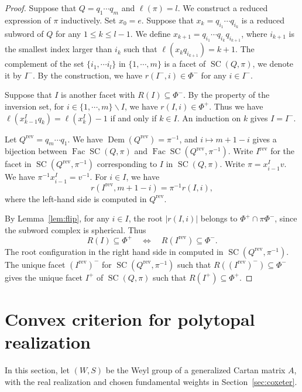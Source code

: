\documentclass[11pt,a4paper]{article}
\theoremstyle{definition}
\theoremstyle{remark}
\newcommand{\SC}{\operatorname{SC}}
\newcommand{\Dem}{\operatorname{Dem}}
\newcommand{\Fac}{\operatorname{Fac}}
\numberwithin{equation}{section}
\newcommand{\SCQ}{\operatorname{SC}(Q,\pi)}
\begin{document}
\begin{proof}
Suppose that $Q=q_1\cdots q_m$ and $\ell(\pi)=l$. We construct a reduced expression of $\pi$ inductively. Set $x_0=e$. Suppose that $x_k=q_{i_1}\cdots q_{i_k}$ is a reduced subword of $Q$ for any $1\leq k \leq l-1$. We define $x_{k+1}=q_{i_1}\cdots q_{i_k}q_{i_{k+1}}$, where $i_{k+1}$ is the smallest index larger than $i_k$ such that $\ell(x_k q_{i_{k+1}})=k+1$. The complement of the set $\{i_1,\cdots i_l\}$ in $\{1,\cdots, m\}$ is a facet of $\SCQ$, we denote it by $I^-$. By the construction, we have $r(I^-,i)\in \Phi^-$ for any $i\in I^-$. 

Suppose that $I$ is another facet with $R(I)\subseteq\Phi^-$. By the property of the inversion set, for $i\in \{1,\cdots , m\}\backslash I$, we have $r(I,i)\in \Phi^+$. Thus we have $\ell(x^I_{k-1}q_k)=\ell(x^I_k)-1$ if and only if $k\in I$. An induction on $k$ gives $I=I^-$.

Let $Q^{\mathrm{rev}}=q_m\cdots q_1$. We have $\Dem(Q^{\mathrm{rev}})=\pi^{-1}$, and $i\mapsto m+1-i$ gives a bijection between $\Fac \SC(Q,\pi)$ and $\Fac \SC(Q^{\mathrm{rev}},\pi^{-1})$. Write $I^{\mathrm{rev}}$ for the facet in $\SC(Q^{\mathrm{rev}},\pi^{-1})$ corresponding to $I$ in $\SCQ$.  Write $\pi=x_{i-1}^Iv$. We have $\pi^{-1}x_{i-1}^I=v^{-1}$. For $i\in I$, we have
\[
 r(I^{\mathrm{rev}},m+1-i)=\pi^{-1}r(I,i),
\]
where the left-hand side is computed in $Q^{\mathrm{rev}}$. 

By Lemma~\ref{lem:flip}, for any $i\in I$, the root $|r(I,i)|$ belongs to $\Phi^+\cap\pi\Phi^-$, since the subword complex is spherical. Thus
\[
 R(I)\subseteq\Phi^+
 \quad\Longleftrightarrow\quad
 R(I^{\mathrm{rev}})\subseteq\Phi^-.
\]
The root configuration in the right hand side in computed in $\SC(Q^{\mathrm{rev}},\pi^{-1})$. The unique facet $(I^{\mathrm{rev}})^-$ for $\SC(Q^{\mathrm{rev}},\pi^{-1})$ such that $R((I^{\mathrm{rev}})^-)\subseteq \Phi^-$ gives the unique facet $I^+$ of $\SC(Q,\pi)$ such that $R(I^+)\subseteq \Phi^+$.
\end{proof}




\section{Convex criterion for polytopal realization}
\label{sec:km}

In this section, let $(W,S)$ be the Weyl group of a generalized Cartan matrix $A$, with the real realization and chosen fundamental weights in Section~\ref{sec:coxeter}. 
\end{document}
